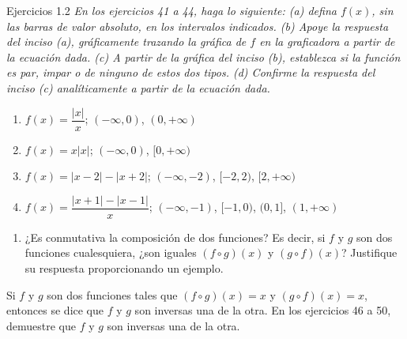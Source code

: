 \documentclass[aspectratio=169,10pt]{beamer}
\begin{document}
\begin{frame}{Ejercicios 1.2}
\textit{En los ejercicios 41 a 44, haga lo siguiente: (a) defina $f(x)$, sin las barras de valor absoluto, en los intervalos indicados. (b) Apoye la respuesta del inciso (a), gráficamente trazando la gráfica de $f$ en la graficadora a partir de la ecuación dada. (c) A partir de la gráfica del inciso (b), establezca si la función es par, impar o de ninguno de estos dos tipos. (d) Confirme la respuesta del inciso (c) analíticamente a partir de la ecuación dada.}

\begin{enumerate}
\item $f(x)=\dfrac{|x|}{x}$; $(-\infty,0)$, $(0,+\infty)$
\item $f(x)=x|x|$; $(-\infty,0)$, $[0,+\infty)$
\item $f(x)=|x-2|-|x+2|$; $(-\infty,-2)$, $[-2,2)$, $[2,+\infty)$
\item $f(x)=\dfrac{|x+1|-|x-1|}{x}$; $(-\infty,-1)$, $[-1,0)$, $(0,1]$, $(1,+\infty)$
\end{enumerate}

\begin{enumerate}
\item ¿Es conmutativa la composición de dos funciones? Es decir, si $f$ y $g$ son dos funciones cualesquiera, ¿son iguales $(f\circ g)(x)$ y $(g\circ f)(x)$? Justifique su respuesta proporcionando un ejemplo.
\end{enumerate}

Si $f$ y $g$ son dos funciones tales que $(f\circ g)(x)=x$ y $(g\circ f)(x)=x$, entonces se dice que $f$ y $g$ son inversas una de la otra. En los ejercicios 46 a 50, demuestre que $f$ y $g$ son inversas una de la otra.


\end{frame}
\end{document}
